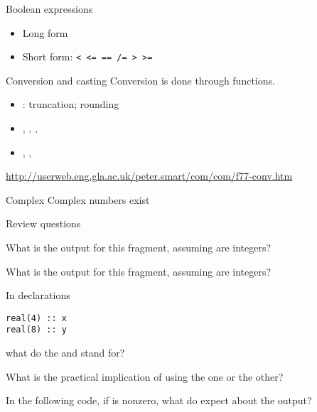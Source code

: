 \begin{block}{Boolean expressions}
  \label{sl:fbool}
  \begin{itemize}
  \item 
    Long form
  \item Short form:
    \verb+< <= == /= > >=+
  \end{itemize}
\end{block}

\begin{block}{Conversion and casting}
  Conversion is done through functions.
  \begin{itemize}
  \item {}: truncation;  rounding
  \item {}, , , 
  \item {}, , 
  \end{itemize}
\url{http://userweb.eng.gla.ac.uk/peter.smart/com/com/f77-conv.htm}
\end{block}


\begin{block}{Complex}
  Complex numbers exist
\end{block}

 {Review questions}

\begin{exercise}
  What is the output for this fragment, assuming  are integers?
\end{exercise}

\begin{exercise}
  What is the output for this fragment, assuming  are integers?
\end{exercise}

\begin{exercise}
  \label{ex:f-elt-rev1}
  In declarations
\begin{verbatim}
real(4) :: x
real(8) :: y
\end{verbatim}
what do the  and  stand for?

What is the practical implication of using the one or the other?
\end{exercise}

\begin{exercise}
  \label{ex:f-elt-rev2}
  In the following code, if  is nonzero, what do expect about
  the output?
\end{exercise}
